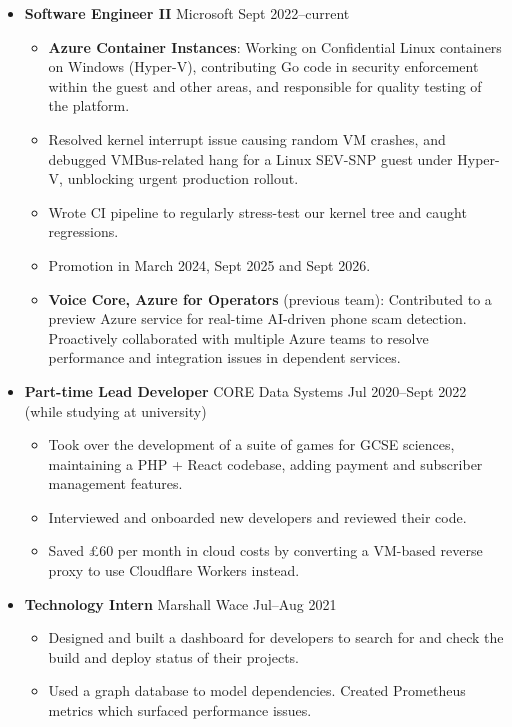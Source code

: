   \begin{itemize}
    \item \textbf{Software Engineer II}
    \dashdiv{} Microsoft \dashdiv{} Sept 2022--current

    \begin{itemize}
      \item \textbf{Azure Container Instances}: Working on Confidential Linux containers on Windows (Hyper-V), contributing Go code in security enforcement within the guest and other areas, and responsible for quality testing of the platform.
      \item Resolved kernel interrupt issue causing random VM crashes, and debugged VMBus-related hang for a Linux SEV-SNP guest under Hyper-V, unblocking urgent production rollout.
      \item Wrote CI pipeline to regularly stress-test our kernel tree and caught regressions.
      \item Promotion in March 2024, Sept 2025 and Sept 2026.
    \end{itemize}

    \begin{itemize}
      \item \textbf{Voice Core, Azure for Operators} (previous team): Contributed to a preview Azure service for real-time AI-driven phone scam detection.  Proactively collaborated with multiple Azure teams to resolve performance and integration issues in dependent services.
    \end{itemize}

    \item \textbf{Part-time Lead Developer} \dashdiv{} CORE Data Systems \dashdiv{} Jul 2020--Sept 2022 (while studying at university)

    \begin{itemize}
      \item Took over the development of a suite of games for GCSE sciences, maintaining a PHP + React codebase, adding payment and subscriber management features.
      \item Interviewed and onboarded new developers and reviewed their code.
      \item Saved £60 per month in cloud costs by converting a VM-based reverse proxy to use Cloudflare Workers instead.
    \end{itemize}

    \item \textbf{Technology Intern} \dashdiv{} Marshall Wace \dashdiv{} Jul--Aug 2021

    \begin{itemize}
      \item Designed and built a dashboard for developers to search for and check the build and deploy status of their projects.
      \item Used a graph database to model dependencies. Created Prometheus metrics which surfaced performance issues.
    \end{itemize}
  \end{itemize}

